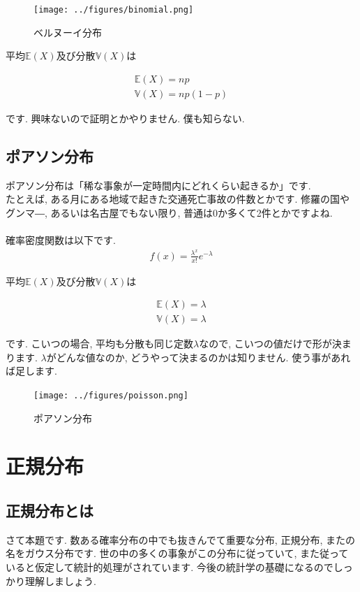\documentclass[11pt,a4paper,uplatex]{ujreport} 	%
\begin{document}
\begin{figure}[H]
\label{im:bernoulli}
  \centering
  \texttt{[image: ../figures/binomial.png]}
  \caption{ベルヌーイ分布}
\end{figure}

平均$\mathbb{E}(X)$及び分散$\mathbb{V}(X)$は

\begin{align}
\mathbb{E}(X) = np\\
\mathbb{V}(X) = np(1-p)
\end{align}

です. 興味ないので証明とかやりません. 僕も知らない.

\subsection{ポアソン分布}
ポアソン分布は「稀な事象が一定時間内にどれくらい起きるか」です.\\

たとえば, ある月にある地域で起きた交通死亡事故の件数とかです. 修羅の国やグンマ―, あるいは名古屋でもない限り, 普通は0か多くて2件とかですよね.\\
\\

確率密度関数は以下です.
\begin{align}
f(x) = \frac{\lambda^x}{x!}e^{-\lambda}
\end{align}

平均$\mathbb{E}(X)$及び分散$\mathbb{V}(X)$は

\begin{align}
\mathbb{E}(X) = \lambda\\
\mathbb{V}(X) = \lambda
\end{align}

です. こいつの場合, 平均も分散も同じ定数$\lambda$なので, こいつの値だけで形が決まります. $\lambda$がどんな値なのか, どうやって決まるのかは知りません. 使う事があれば足します.\\

\begin{figure}[H]
\label{im:poisson}
  \centering
  \texttt{[image: ../figures/poisson.png]}
  \caption{ポアソン分布}
\end{figure}

\section{正規分布}
\subsection{正規分布とは}
さて本題です. 数ある確率分布の中でも抜きんでて重要な分布, 正規分布, またの名をガウス分布です. 世の中の多くの事象がこの分布に従っていて, また従っていると仮定して統計的処理がされています. 今後の統計学の基礎になるのでしっかり理解しましょう.\\
\\
\end{document}
